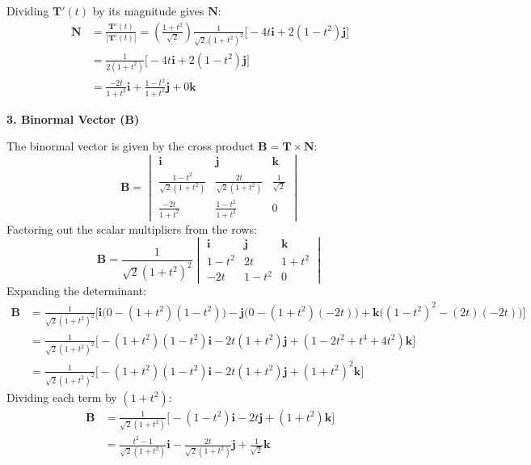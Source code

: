 \documentclass[12pt,a4paper]{article}
\begin{document}
\begin{enumerate}
\begin{tcolorbox}[enhanced,breakable,ansbox,colback=cD!4,colframe=cD,boxrule=0.8pt,arc=5pt,title={\textbf{Answer}},fonttitle=\bfseries\color{white},colbacktitle=cD]
Dividing $\mathbf{T}'(t)$ by its magnitude gives $\mathbf{N}$:
\begin{align*}
    \mathbf{N} &= \frac{\mathbf{T}'(t)}{|\mathbf{T}'(t)|} = \left( \frac{1 + t^2}{\sqrt{2}} \right) \frac{1}{\sqrt{2}(1 + t^2)^2} \big[ -4t\mathbf{i} + 2(1 - t^2)\mathbf{j} \big] \\
    &= \frac{1}{2(1 + t^2)} \big[ -4t\mathbf{i} + 2(1 - t^2)\mathbf{j} \big] \\
    &= \boxed{\frac{-2t}{1 + t^2}\mathbf{i} + \frac{1 - t^2}{1 + t^2}\mathbf{j} + 0\mathbf{k}}
\end{align*}

\vspace{1em}
\textbf{3. Binormal Vector ($\mathbf{B}$)}

The binormal vector is given by the cross product $\mathbf{B} = \mathbf{T} \times \mathbf{N}$:
\[ \mathbf{B} = \begin{vmatrix} 
\mathbf{i} & \mathbf{j} & \mathbf{k} \\ 
\frac{1 - t^2}{\sqrt{2}(1 + t^2)} & \frac{2t}{\sqrt{2}(1 + t^2)} & \frac{1}{\sqrt{2}} \\ 
\frac{-2t}{1 + t^2} & \frac{1 - t^2}{1 + t^2} & 0 
\end{vmatrix} \]
Factoring out the scalar multipliers from the rows:
\[ \mathbf{B} = \frac{1}{\sqrt{2}(1 + t^2)^2} \begin{vmatrix} 
\mathbf{i} & \mathbf{j} & \mathbf{k} \\ 
1 - t^2 & 2t & 1 + t^2 \\ 
-2t & 1 - t^2 & 0 
\end{vmatrix} \]
Expanding the determinant:
\begin{align*}
    \mathbf{B} &= \frac{1}{\sqrt{2}(1 + t^2)^2} \Big[ \mathbf{i}\big(0 - (1 + t^2)(1 - t^2)\big) - \mathbf{j}\big(0 - (1 + t^2)(-2t)\big) + \mathbf{k}\big((1 - t^2)^2 - (2t)(-2t)\big) \Big] \\
    &= \frac{1}{\sqrt{2}(1 + t^2)^2} \Big[ -(1 + t^2)(1 - t^2)\mathbf{i} - 2t(1 + t^2)\mathbf{j} + (1 - 2t^2 + t^4 + 4t^2)\mathbf{k} \Big] \\
    &= \frac{1}{\sqrt{2}(1 + t^2)^2} \Big[ -(1 + t^2)(1 - t^2)\mathbf{i} - 2t(1 + t^2)\mathbf{j} + (1 + t^2)^2\mathbf{k} \Big]
\end{align*}
Dividing each term by $(1 + t^2)$:
\begin{align*}
    \mathbf{B} &= \frac{1}{\sqrt{2}(1 + t^2)} \Big[ -(1 - t^2)\mathbf{i} - 2t\mathbf{j} + (1 + t^2)\mathbf{k} \Big] \\
    &= \boxed{\frac{t^2 - 1}{\sqrt{2}(1 + t^2)}\mathbf{i} - \frac{2t}{\sqrt{2}(1 + t^2)}\mathbf{j} + \frac{1}{\sqrt{2}}\mathbf{k}}
\end{align*}


\end{tcolorbox}
\end{enumerate}
\end{document}
